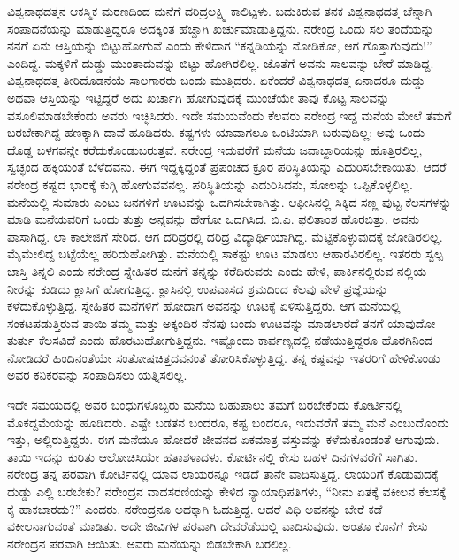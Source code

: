 ವಿಶ್ವನಾಥದತ್ತನ ಆಕಸ್ಮಿಕ ಮರಣದಿಂದ ಮನೆಗೆ ದರಿದ್ರಲಕ್ಷ್ಮಿ ಕಾಲಿಟ್ಟಳು. ಬದುಕಿರುವ ತನಕ ವಿಶ್ವನಾಥದತ್ತ ಚೆನ್ನಾಗಿ ಸಂಪಾದನೆಯನ್ನು ಮಾಡುತ್ತಿದ್ದರೂ ಅದಕ್ಕಿಂತ ಹೆಚ್ಚಾಗಿ ಖರ್ಚುಮಾಡುತ್ತಿದ್ದನು. ನರೇಂದ್ರ ಒಂದು ಸಲ ತಂದೆಯನ್ನು ನನಗೆ ಏನು ಆಸ್ತಿಯನ್ನು ಬಿಟ್ಟುಹೋಗುವೆ ಎಂದು ಕೇಳಿದಾಗ “ಕನ್ನಡಿಯನ್ನು ನೋಡಿಕೋ, ಆಗ ಗೊತ್ತಾಗುವುದು!” ಎಂದಿದ್ದ. ಮಕ್ಕಳಿಗೆ ದುಡ್ಡು ಮುಂತಾದುವನ್ನು ಬಿಟ್ಟು ಹೋಗಿರಲಿಲ್ಲ. ಜೊತೆಗೆ ಅವನು ಸಾಲವನ್ನು ಬೇರೆ ಮಾಡಿದ್ದ. ವಿಶ್ವನಾಥದತ್ತ ತೀರಿದೊಡನೆಯೆ ಸಾಲಗಾರರು ಬಂದು ಮುತ್ತಿದರು. ಏಕೆಂದರೆ ವಿಶ್ವನಾಥದತ್ತ ಏನಾದರೂ ದುಡ್ಡು ಅಥವಾ ಆಸ್ತಿಯನ್ನು ಇಟ್ಟಿದ್ದರೆ ಅದು ಖರ್ಚಾಗಿ ಹೋಗುವುದಕ್ಕೆ ಮುಂಚೆಯೇ ತಾವು ಕೊಟ್ಟ ಸಾಲವನ್ನು ವಸೂಲಿಮಾಡಬೇಕೆಂದು ಅವರು ಇಚ್ಛಿಸಿದರು. ಇದೇ ಸಮಯವೆಂದು ಕೆಲವರು ನರೇಂದ್ರ ಇದ್ದ ಮನೆಯ ಮೇಲೆ ತಮಗೆ ಬರಬೇಕಾಗಿದ್ದ ಹಣಕ್ಕಾಗಿ ದಾವೆ ಹೂಡಿದರು. ಕಷ್ಟಗಳು ಯಾವಾಗಲೂ ಒಂಟಿಯಾಗಿ ಬರುವುದಿಲ್ಲ; ಅವು ಒಂದು ದೊಡ್ಡ ಬಳಗವನ್ನೇ ಕರೆದುಕೊಂಡುಬರುತ್ತವೆ. ನರೇಂದ್ರ ಇದುವರೆಗೆ ಮನೆಯ ಜವಾಬ್ದಾರಿಯನ್ನು ಹೊತ್ತಿರಲಿಲ್ಲ, ಸ್ವಚ್ಛಂದ ಹಕ್ಕಿಯಂತೆ ಬೆಳೆದವನು. ಈಗ ಇದ್ದಕ್ಕಿದ್ದಂತೆ ಪ್ರಪಂಚದ ಕ್ರೂರ ಪರಿಸ್ಥಿತಿಯನ್ನು ಎದುರಿಸಬೇಕಾಯಿತು. ಆದರೆ ನರೇಂದ್ರ ಕಷ್ಟದ ಭಾರಕ್ಕೆ ಕುಗ್ಗಿ ಹೋಗುವವನಲ್ಲ. ಪರಿಸ್ಥಿತಿಯನ್ನು ಎದುರಿಸಿದನು, ಸೋಲನ್ನು ಒಪ್ಪಿಕೊಳ್ಳಲಿಲ್ಲ. ಮನೆಯಲ್ಲಿ ಸುಮಾರು ಎಂಟು ಜನಗಳಿಗೆ ಊಟವನ್ನು ಒದಗಿಸಬೇಕಾಗಿತ್ತು. ಆಫೀಸಿನಲ್ಲಿ ಸಿಕ್ಕಿದ ಸಣ್ಣ ಪುಟ್ಟ ಕೆಲಸಗಳನ್ನು ಮಾಡಿ ಮನೆಯವರಿಗೆ ಒಂದು ತುತ್ತು ಅನ್ನವನ್ನು ಹೇಗೋ ಒದಗಿಸಿದ. ಬಿ.ಎ. ಫಲಿತಾಂಶ ಹೊರಬಿತ್ತು. ಅವನು ಪಾಸಾಗಿದ್ದ. ಲಾ ಕಾಲೇಜಿಗೆ ಸೇರಿದ. ಆಗ ದರಿದ್ರರಲ್ಲಿ ದರಿದ್ರ ವಿದ್ಯಾರ್ಥಿಯಾಗಿದ್ದ. ಮೆಟ್ಟಿಕೊಳ್ಳುವುದಕ್ಕೆ ಜೋಡಿರಲಿಲ್ಲ. ಮೈಮೇಲಿದ್ದ ಬಟ್ಟೆಯೆಲ್ಲ ಹರಿದುಹೋಗಿತ್ತು. ಮನೆಯಲ್ಲಿ ಸಾಕಷ್ಟು ಊಟ ಮಾಡಲು ಆಹಾರವಿರಲಿಲ್ಲ. ಇತರರು ಸ್ವಲ್ಪ ಜಾಸ್ತಿ ತಿನ್ನಲಿ ಎಂದು ನರೇಂದ್ರ ಸ್ನೇಹಿತರ ಮನೆಗೆ ತನ್ನನ್ನು ಕರೆದಿರುವರು ಎಂದು ಹೇಳಿ, ಪಾರ್ಕಿನಲ್ಲಿರುವ ನಲ್ಲಿಯ ನೀರನ್ನು ಕುಡಿದು ಕ್ಲಾಸಿಗೆ ಹೋಗುತ್ತಿದ್ದ. ಕ್ಲಾಸಿನಲ್ಲಿ ಉಪವಾಸದ ಶ್ರಮದಿಂದ ಕೆಲವು ವೇಳೆ ಪ್ರಜ್ಞೆಯನ್ನು ಕಳೆದುಕೊಳ್ಳುತ್ತಿದ್ದ. ಸ್ನೇಹಿತರ ಮನೆಗಳಿಗೆ ಹೋದಾಗ ಅವನನ್ನು ಊಟಕ್ಕೆ ಏಳಿಸುತ್ತಿದ್ದರು. ಆಗ ಮನೆಯಲ್ಲಿ ಸಂಕಟಪಡುತ್ತಿರುವ ತಾಯಿ ತಮ್ಮ ಮತ್ತು ಅಕ್ಕಂದಿರ ನೆನಪು ಬಂದು ಊಟವನ್ನು ಮಾಡಲಾರದೆ ತನಗೆ ಯಾವುದೋ ತುರ್ತು ಕೆಲಸವಿದೆ ಎಂದು ಹೊರಟುಹೋಗುತ್ತಿದ್ದನು. ಇಷ್ಟೊಂದು ಕಾರ್ಪಣ್ಯದಲ್ಲಿ ನಡೆಯುತ್ತಿದ್ದರೂ ಹೊರಗಿನಿಂದ ನೋಡಿದರೆ ಹಿಂದಿನಂತೆಯೇ ಸಂತೋಷಚಿತ್ತದವನಂತೆ ತೋರಿಸಿಕೊಳ್ಳುತ್ತಿದ್ದ. ತನ್ನ ಕಷ್ಟವನ್ನು ಇತರರಿಗೆ ಹೇಳಿಕೊಂಡು ಅವರ ಕನಿಕರವನ್ನು ಸಂಪಾದಿಸಲು ಯತ್ನಿಸಲಿಲ್ಲ.

ಇದೇ ಸಮಯದಲ್ಲಿ ಅವರ ಬಂಧುಗಳೊಬ್ಬರು ಮನೆಯ ಬಹುಪಾಲು ತಮಗೆ ಬರಬೇಕೆಂದು ಕೋರ್ಟಿನಲ್ಲಿ ಮೊಕದ್ದಮೆಯನ್ನು ಹೂಡಿದರು. ಎಷ್ಟೇ ಬಡತನ ಬಂದರೂ, ಕಷ್ಟ ಬಂದರೂ, ಇದುವರೆಗೆ ತಮ್ಮ ಮನೆ ಎಂಬುದೊಂದು ಇತ್ತು, ಅಲ್ಲಿರುತ್ತಿದ್ದರು. ಈಗ ಮನೆಯೂ ಹೋದರೆ ಜೀವನದ ಏಕಮಾತ್ರ ವಸ್ತುವನ್ನು ಕಳೆದುಕೊಂಡಂತೆ ಆಗುವುದು. ತಾಯಿ ಇದನ್ನು ಕುರಿತು ಆಲೋಚಿಸಿಯೇ ಹತಾಶಳಾದಳು. ಕೋರ್ಟಿನಲ್ಲಿ ಕೇಸು ಬಹಳ ದಿನಗಳವರೆಗೆ ಸಾಗಿತು. ನರೇಂದ್ರ ತನ್ನ ಪರವಾಗಿ ಕೋರ್ಟಿನಲ್ಲಿ ಯಾವ ಲಾಯರನ್ನೂ ಇಡದೆ ತಾನೇ ವಾದಿಸುತ್ತಿದ್ದ. ಲಾಯರಿಗೆ ಕೊಡುವುದಕ್ಕೆ ದುಡ್ಡು ಎಲ್ಲಿ ಬರಬೇಕು? ನರೇಂದ್ರನ ವಾದಸರಣಿಯನ್ನು ಕೇಳಿದ ನ್ಯಾಯಾಧಿಪತಿಗಳು, “ನೀನು ಏತಕ್ಕೆ ವಕೀಲನ ಕೆಲಸಕ್ಕೆ ಕೈ ಹಾಕಬಾರದು?” ಎಂದರು. ನರೇಂದ್ರನೂ ಅದಕ್ಕಾಗಿ ಓದುತ್ತಿದ್ದ. ಆದರೆ ವಿಧಿ ಅವನನ್ನು ಬೇರೆ ಕಡೆ ವಕೀಲನಾಗುವಂತೆ ಮಾಡಿತು. ಅದೇ ಜೀವಿಗಳ ಪರವಾಗಿ ದೇವರೆಡೆಯಲ್ಲಿ ವಾದಿಸುವುದು. ಅಂತೂ ಕೊನೆಗೆ ಕೇಸು ನರೇಂದ್ರನ ಪರವಾಗಿ ಆಯಿತು. ಅವರು ಮನೆಯನ್ನು ಬಿಡಬೇಕಾಗಿ ಬರಲಿಲ್ಲ.

